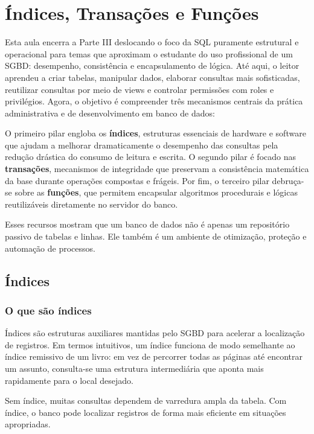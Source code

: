 \chapter{Índices, Transações e Funções}
\label{cap:indices_transacoes_funcoes}

Esta aula encerra a Parte III deslocando o foco da SQL puramente estrutural e operacional para temas que aproximam o estudante do uso profissional de um SGBD: desempenho, consistência e encapsulamento de lógica. Até aqui, o leitor aprendeu a criar tabelas, manipular dados, elaborar consultas mais sofisticadas, reutilizar consultas por meio de views e controlar permissões com roles e privilégios. Agora, o objetivo é compreender três mecanismos centrais da prática administrativa e de desenvolvimento em banco de dados:

O primeiro pilar engloba os \textbf{índices}, estruturas essenciais de hardware e software que ajudam a melhorar dramaticamente o desempenho das consultas pela redução drástica do consumo de leitura e escrita. O segundo pilar é focado nas \textbf{transações}, mecanismos de integridade que preservam a consistência matemática da base durante operações compostas e frágeis. Por fim, o terceiro pilar debruça-se sobre as \textbf{funções}, que permitem encapsular algoritmos procedurais e lógicas reutilizáveis diretamente no servidor do banco.

Esses recursos mostram que um banco de dados não é apenas um repositório passivo de tabelas e linhas. Ele também é um ambiente de otimização, proteção e automação de processos.

\section{Índices}

\subsection{O que são índices}

Índices são estruturas auxiliares mantidas pelo SGBD para acelerar a localização de registros. Em termos intuitivos, um índice funciona de modo semelhante ao índice remissivo de um livro: em vez de percorrer todas as páginas até encontrar um assunto, consulta-se uma estrutura intermediária que aponta mais rapidamente para o local desejado.

Sem índice, muitas consultas dependem de varredura ampla da tabela. Com índice, o banco pode localizar registros de forma mais eficiente em situações apropriadas.

